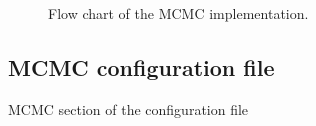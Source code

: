 \documentclass[11pt, chapterprefix, headsepline]{scrartcl}
\begin{document}
\begin{appendix}
\begin{figure}[!tb]
  
  \caption{Flow chart of the MCMC implementation.}
  \label{fig:MCMC_flow}
\end{figure}


\subsection{MCMC configuration file}


\begin{table}
  \caption{MCMC section of the configuration file}
  \label{tab:MCMC}


\end{table}
\end{appendix}
\end{document}
